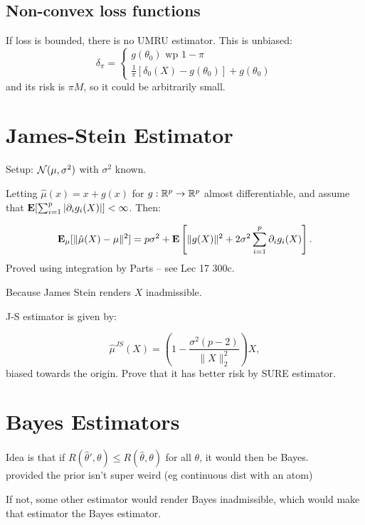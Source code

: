 \documentclass{article}
\begin{document}
\subsection{Non-convex loss functions}
If loss is bounded, there is no UMRU estimator. This is unbiased:
$$\delta_\pi = \begin{cases}
	g(\theta_0) \text{ wp } 1-\pi\\
	\frac 1 \pi [\delta_0 (X) - g(\theta_0)] + g(\theta_0)
\end{cases}$$
and its risk is $\pi M$, so it could be arbitrarily small. 
\section{James-Stein Estimator}
Setup: $\mathcal N(\mu,\sigma^2)$ with $\sigma^2$ known. 

\begin{theorem}
Letting $\hat \mu(x) = x+g(x)$ for $g: \mathbb R^p \to \mathbb R^p$ almost differentiable, and assume that $\mathbf{E}[\sum_{i=1}^p |\partial_i g_i (X)|] <\infty$. Then:

$$\mathbf{E}_\mu[\|\hat \mu(X) - \mu\|^2] = p\sigma^2 + \mathbf{E}\left[\|g(X)\|^2 + 2\sigma^2 \sum_{i=1}^p \partial_i g_i(X)\right].$$
Proved using integration by Parts -- see Lec 17 300c.
\end{theorem}
\begin{fact}
Because James Stein renders $X$ inadmissible. 	
\end{fact}

J-S estimator is given by:

$$\hat \mu^{JS} (X) = \left ( 1-\frac{\sigma^2(p-2)}{\|X\|_2^2}\right)X,$$
biased towards the origin. Prove that it has better risk by SURE estimator. 

\section{Bayes Estimators}
\begin{fact}
Idea is that if $R(\hat \theta ' ,\theta) \leq R(\hat \theta , \theta)$ for all $\theta$, it would then be Bayes. \\ provided the prior isn't super weird (eg continuous dist with an atom) 

\end{fact}

\begin{fact}
If not, some other estimator would render Bayes inadmissible, which would make that estimator the Bayes estimator.
\end{fact}
\end{document}

